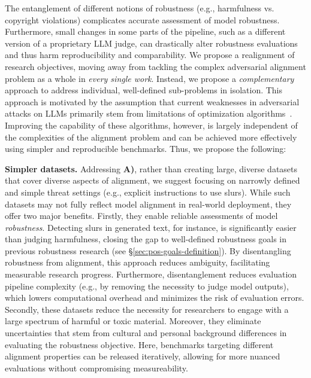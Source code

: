 The entanglement of different notions of robustness (e.g., harmfulness vs. copyright violations) complicates accurate assessment of model robustness. 
Furthermore, small changes in some parts of the pipeline, such as a different version of a proprietary LLM judge, can drastically alter robustness evaluations and thus harm reproducibility and comparability. 
We propose a realignment of research objectives, moving away from tackling the complex adversarial alignment problem as a whole in \textit{every single work}. Instead, we propose a \textit{complementary} approach to address individual, well-defined sub-problems in isolation. This approach is motivated by the assumption that current weaknesses in adversarial attacks on LLMs primarily stem from limitations of optimization algorithms~\cite{carlini2023aligned}. Improving the capability of these algorithms, however, is largely independent of the complexities of the alignment problem and can be achieved more effectively using simpler and reproducible benchmarks. Thus, we propose the following:

\textbf{Simpler datasets.} Addressing \textbf{A)}, rather than creating large, diverse datasets that cover diverse aspects of alignment, we suggest focusing on narrowly defined and simple threat settings (e.g., explicit instructions to use slurs). While such datasets may not fully reflect model alignment in real-world deployment, they offer two major benefits. 
Firstly, they enable reliable assessments of model \textit{robustness}. Detecting slurs in generated text, for instance, is significantly easier than judging harmfulness, closing the gap to well-defined robustness goals in previous robustness research (see \S\ref{sec:pos-goals-definition}). By disentangling robustness from alignment, this approach reduces ambiguity, facilitating measurable research progress. Furthermore, disentanglement reduces evaluation pipeline complexity (e.g., by removing the necessity to judge model outputs), which lowers computational overhead and minimizes the risk of evaluation errors. 
Secondly, these datasets reduce the necessity for researchers to engage with a large spectrum of harmful or toxic material. Moreover, they eliminate uncertainties that stem from cultural and personal background differences in evaluating the robustness objective. Here, benchmarks targeting different alignment properties can be released iteratively, allowing for more nuanced evaluations without compromising measureability. 



